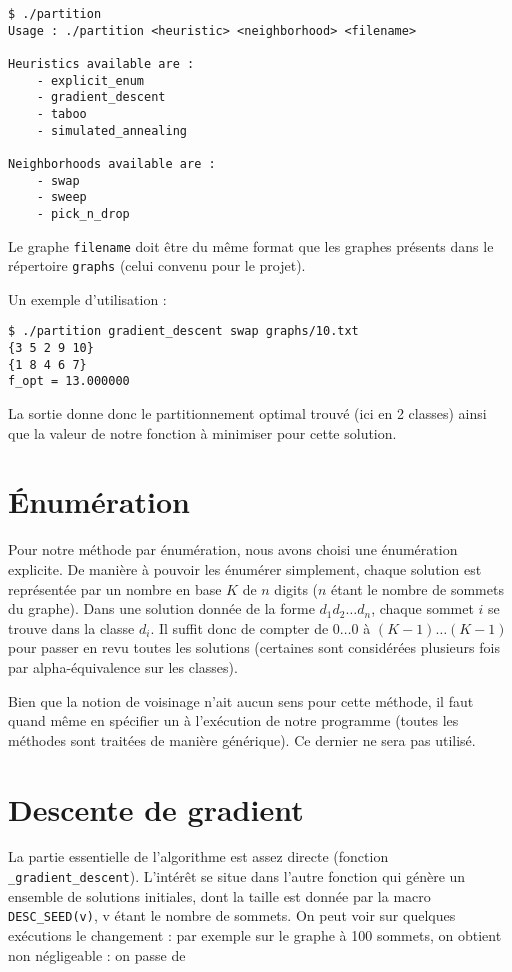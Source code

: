 \documentclass[12pt, a4paper]{article}
\begin{document}
\begin{verbatim}
$ ./partition 
Usage : ./partition <heuristic> <neighborhood> <filename>

Heuristics available are :
    - explicit_enum
    - gradient_descent
    - taboo
    - simulated_annealing

Neighborhoods available are :
    - swap
    - sweep
    - pick_n_drop
\end{verbatim}

Le graphe \texttt{filename} doit être du même format que les graphes présents dans le répertoire \texttt{graphs} (celui convenu pour le projet).

Un exemple d'utilisation :

\begin{verbatim}
$ ./partition gradient_descent swap graphs/10.txt
{3 5 2 9 10}
{1 8 4 6 7}
f_opt = 13.000000
\end{verbatim}

La sortie donne donc le partitionnement optimal trouvé (ici en 2 classes) ainsi que la valeur de notre fonction à minimiser pour cette solution.

\section{\'Enumération}
Pour notre méthode par énumération, nous avons choisi une énumération explicite. De manière à pouvoir les énumérer simplement, chaque solution est représentée par un nombre en base $K$ de $n$ digits ($n$ étant le nombre de sommets du graphe). Dans une solution donnée de la forme $d_1 d_2 \dots d_n$, chaque sommet $i$ se trouve dans la classe $d_i$. Il suffit donc de compter de $0 \dots 0$ à $(K-1) \dots (K-1)$ pour passer en revu toutes les solutions (certaines sont considérées plusieurs fois par alpha-équivalence sur les classes).

Bien que la notion de voisinage n'ait aucun sens pour cette méthode, il faut quand même en spécifier un à l'exécution de notre programme (toutes les méthodes sont traitées de manière générique). Ce dernier ne sera pas utilisé.

\section{Descente de gradient}
La partie essentielle de l'algorithme est assez directe
(fonction \texttt{\_{}gradient\_{}descent}). L'intérêt se situe dans l'autre fonction
qui génère un ensemble de solutions initiales, dont la taille est donnée par la macro 
\texttt{DESC\_SEED(v)}, v étant le nombre de sommets. On peut voir sur quelques exécutions le changement : par exemple
sur le graphe à 100 sommets, on obtient non négligeable : on passe de 
\end{document}
